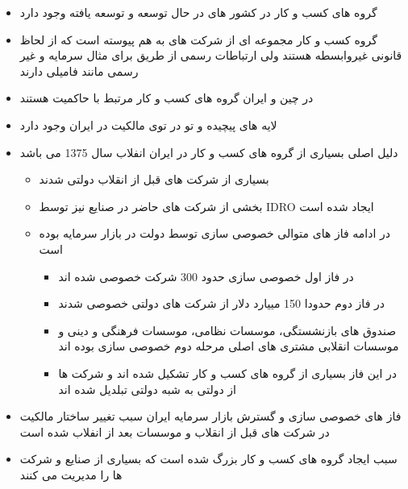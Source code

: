 \documentclass[12pt, a4paper]{article}
\begin{document}
\begin{itemize}
	\item 
	گروه های کسب و کار در کشور های در حال توسعه و توسعه یافته وجود دارد
	
	\item 
	گروه کسب و کار مجموعه ای از شرکت های به هم پیوسته است که از لحاظ قانونی غیروابسطه هستند ولی ارتباطات رسمی از طریق برای مثال سرمایه و غیر رسمی مانند فامیلی دارند
	\item 
	در چین و ایران گروه های کسب و کار مرتبط با حاکمیت هستند
	\item 
	لایه های پیچیده و تو در توی مالکیت در ایران وجود دارد 
	
	\item 
	دلیل اصلی بسیاری از گروه های کسب و کار در ایران انفلاب سال 
1375 می باشد
\begin{itemize}
	\item 
	بسیاری از شرکت های قبل از انقلاب دولتی شدند
	\item 
	بخشی از شرکت های حاضر در صنایع نیز توسط IDRO ایجاد شده است
	\item 
	در ادامه فاز های متوالی خصوصی سازی توسط دولت در بازار سرمایه  بوده است
\begin{itemize}
	\item 
	در فاز اول خصوصی سازی حدود 300 شرکت خصوصی شده اند
	\item 
	در فاز دوم حدودا 150 مییارد دلار از شرکت های دولتی خصوصی شدند 
	\item 
	صندوق های بازنشستگی، موسسات نظامی، موسسات فرهنگی و دینی و موسسات انقلابی مشتری های اصلی مرحله دوم خصوصی سازی بوده اند
	\item 
	در این فاز بسیاری از  گروه های کسب و کار تشکیل شده اند و شرکت ها از دولتی به شبه دولتی تبلدیل شده اند	
\end{itemize}
\end{itemize}	
\item
فاز های خصوصی سازی و گسترش بازار سرمایه ایران سبب تغییر ساختار مالکیت در شرکت های قبل از انقلاب و موسسات بعد از انفلاب شده است
\item
سبب ایجاد گروه های کسب و کار بزرگ شده است که بسیاری از صنایع و شرکت ها را مدیریت می کنند

\end{itemize}
\end{document}
